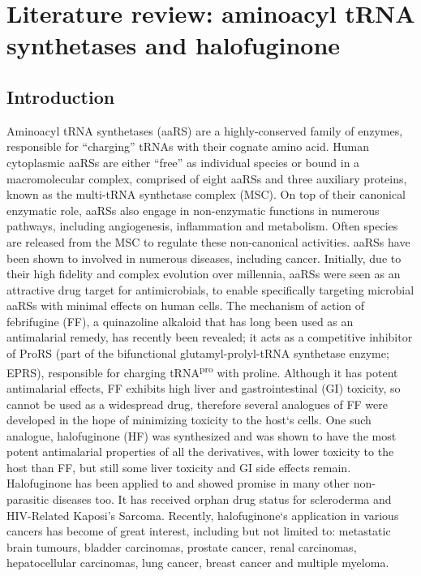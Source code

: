 \chapter{\label{ch:2-litreview}Literature review: aminoacyl tRNA synthetases and halofuginone}

\section{Introduction}
Aminoacyl tRNA synthetases (aaRS) are a highly-conserved family of enzymes, responsible for ``charging'' tRNAs with their cognate amino acid\cite{pouplana2020}.
Human cytoplasmic aaRSs are either ``free'' as individual species or bound in a macromolecular complex, comprised of eight aaRSs and three auxiliary proteins, known as the multi-tRNA synthetase complex (MSC)\cite{pouplana2020}.
On top of their canonical enzymatic role, aaRSs also engage in non-enzymatic functions in numerous pathways, including angiogenesis, inflammation and metabolism.
Often species are released from the MSC to regulate these non-canonical activities\cite{kim2019evolution}.
aaRSs have been shown to involved in numerous diseases, including cancer.
Initially, due to their high fidelity and complex evolution over millennia, aaRSs were seen as an attractive drug target for antimicrobials, to enable specifically targeting microbial aaRSs with minimal effects on human cells.
The mechanism of action of febrifugine (FF), a quinazoline alkaloid that has long been used as an antimalarial remedy, has recently been revealed; it acts as a competitive inhibitor of ProRS (part of the bifunctional glutamyl-prolyl-tRNA synthetase enzyme; EPRS), responsible for charging tRNA\textsuperscript{pro} with proline.
Although it has potent antimalarial effects, FF exhibits high liver and gastrointestinal (GI) toxicity, so cannot be used as a widespread drug, therefore several analogues of FF were developed in the hope of minimizing toxicity to the host`s cells.
One such analogue, halofuginone (HF) was synthesized and was shown to have the most potent antimalarial properties of all the derivatives, with lower toxicity to the host than FF, but still some liver toxicity and GI side effects remain\cite{zhang2017novel}.
Halofuginone has been applied to and showed promise in many other non-parasitic diseases too.
It has received orphan drug status for scleroderma and HIV-Related Kaposi's Sarcoma.
Recently, halofuginone`s application in various cancers has become of great interest, including but not limited to: metastatic brain tumours, bladder carcinomas, prostate cancer, renal carcinomas, hepatocellular carcinomas, lung cancer, breast cancer and multiple myeloma.


